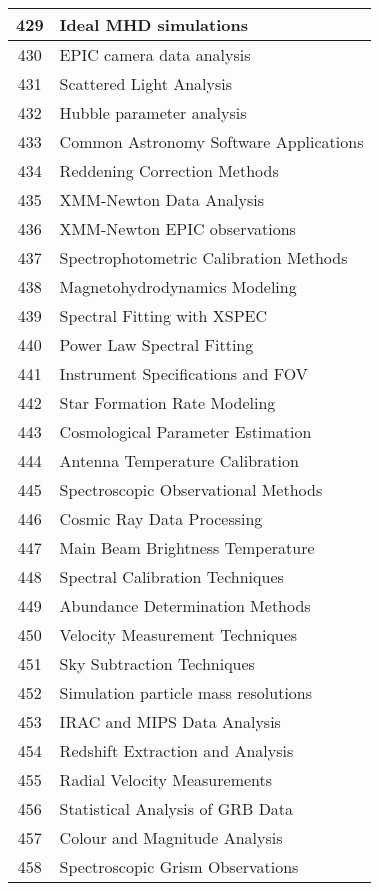 \begin{table}[htbp]
\begin{tabular}{|c|l|}
\hline
429 & Ideal MHD simulations \\
\hline
430 & EPIC camera data analysis \\
\hline
431 & Scattered Light Analysis \\
\hline
432 & Hubble parameter analysis \\
\hline
433 & Common Astronomy Software Applications \\
\hline
434 & Reddening Correction Methods \\
\hline
435 & XMM-Newton Data Analysis \\
\hline
436 & XMM-Newton EPIC observations \\
\hline
437 & Spectrophotometric Calibration Methods \\
\hline
438 & Magnetohydrodynamics Modeling \\
\hline
439 & Spectral Fitting with XSPEC \\
\hline
440 & Power Law Spectral Fitting \\
\hline
441 & Instrument Specifications and FOV \\
\hline
442 & Star Formation Rate Modeling \\
\hline
443 & Cosmological Parameter Estimation \\
\hline
444 & Antenna Temperature Calibration \\
\hline
445 & Spectroscopic Observational Methods \\
\hline
446 & Cosmic Ray Data Processing \\
\hline
447 & Main Beam Brightness Temperature \\
\hline
448 & Spectral Calibration Techniques \\
\hline
449 & Abundance Determination Methods \\
\hline
450 & Velocity Measurement Techniques \\
\hline
451 & Sky Subtraction Techniques \\
\hline
452 & Simulation particle mass resolutions \\
\hline
453 & IRAC and MIPS Data Analysis \\
\hline
454 & Redshift Extraction and Analysis \\
\hline
455 & Radial Velocity Measurements \\
\hline
456 & Statistical Analysis of GRB Data \\
\hline
457 & Colour and Magnitude Analysis \\
\hline
458 & Spectroscopic Grism Observations \\
\hline

\end{tabular}
\end{table}

